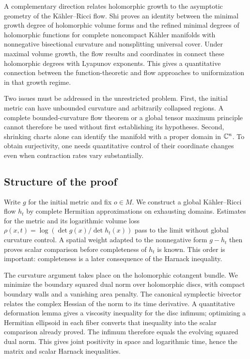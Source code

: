 A complementary direction relates holomorphic growth to the asymptotic
geometry of the K\"ahler--Ricci flow. Shi
\cite[Theorem~1.6]{ShiMinimalDegrees} proves an identity between the
minimal growth degree of holomorphic volume forms and the refined
minimal degrees of holomorphic functions for complete noncompact K\"ahler
manifolds with nonnegative bisectional curvature and nonsplitting
universal cover. Under maximal volume growth, the flow results
and coordinates in \cite[Theorem~1.7 and Corollary~1.12]{ShiMinimalDegrees}
connect these holomorphic degrees with Lyapunov exponents. This gives a
quantitative connection between the function-theoretic and flow
approaches to uniformization in that growth regime.

Two issues must be addressed in the unrestricted problem.
First, the initial metric can have unbounded curvature and arbitrarily
collapsed regions. A complete bounded-curvature flow theorem or a
global tensor maximum principle cannot therefore be used without
first establishing its hypotheses. Second, shrinking charts alone
can identify the manifold with a proper domain in $\mathbb C^n$.
To obtain surjectivity, one needs quantitative control of their
coordinate changes even when contraction rates vary substantially.

\subsection{Structure of the proof}

Write $g$ for the initial metric and fix $o\in M$.
We construct a global K\"ahler--Ricci flow $h_t$ by complete Hermitian
approximations on exhausting domains.  Estimates for the metric and
its logarithmic volume loss
$\rho(x,t)=\log(\det g(x)/\det h_t(x))$ pass to the limit
without global curvature control. A spatial weight adapted to the nonnegative form $g-h_t$
then proves scalar comparison before completeness of $h_t$ is known.
This order is important: completeness is a later consequence of
the Harnack inequality.

The curvature argument takes place on the holomorphic cotangent
bundle. We minimize the boundary squared dual norm over holomorphic
discs, with compact boundary walls and a vanishing area penalty.
The canonical symplectic bivector relates the complex Hessian of
the norm to its time derivative. A quantitative deformation lemma
gives a viscosity inequality for the disc infimum; optimizing a
Hermitian ellipsoid in each fiber converts that inequality into
the scalar comparison already proved. The infimum therefore equals
the evolving squared dual norm. This gives joint positivity in space and
logarithmic time, hence the matrix and scalar Harnack inequalities.

